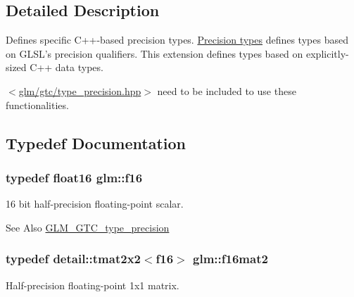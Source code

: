 \subsection{Detailed Description}
Defines specific C++-\/based precision types. \hyperlink{group__core__precision}{Precision types} defines types based on G\-L\-S\-L's precision qualifiers. This extension defines types based on explicitly-\/sized C++ data types.

$<$\hyperlink{type__precision_8hpp}{glm/gtc/type\-\_\-precision.\-hpp}$>$ need to be included to use these functionalities. 

\subsection{Typedef Documentation}
\hypertarget{group__gtc__type__precision_ga55dd9f02a8b986348956057fd5f45c0d}{
\subsubsection[{f16}]{\setlength{\rightskip}{0pt plus 5cm}typedef float16 {\bf glm\-::f16}}}\label{group__gtc__type__precision_ga55dd9f02a8b986348956057fd5f45c0d}


16 bit half-\/precision floating-\/point scalar. 

\begin{DoxySeeAlso}{See Also}
\hyperlink{group__gtc__type__precision}{G\-L\-M\-\_\-\-G\-T\-C\-\_\-type\-\_\-precision} 
\end{DoxySeeAlso}
\hypertarget{group__gtc__type__precision_gaa0e6cf15c6bf4136f596ed129a55ae6b}{
\subsubsection[{f16mat2}]{\setlength{\rightskip}{0pt plus 5cm}typedef detail\-::tmat2x2$<$f16$>$ {\bf glm\-::f16mat2}}}\label{group__gtc__type__precision_gaa0e6cf15c6bf4136f596ed129a55ae6b}


Half-\/precision floating-\/point 1x1 matrix. 

